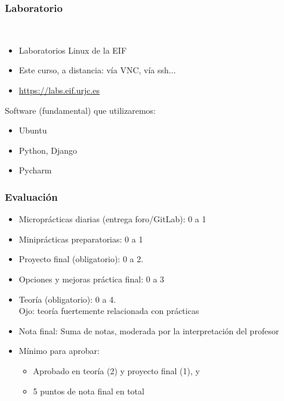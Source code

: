 \begin{frame}
\frametitle{Laboratorio}

~
\vspace{1cm}

\begin{itemize}
\item Laboratorios Linux de la EIF
\item Este curso, a distancia: vía VNC, vía ssh...
\item \url{https://labs.eif.urjc.es}
\end{itemize}

\vspace{1cm}

Software (fundamental) que utilizaremos:

\begin{itemize}
\item Ubuntu
\item Python, Django
\item Pycharm
\end{itemize}
\end{frame}
\usebackgroundtemplate{}



\begin{frame}
\frametitle{Evaluación}

\begin{itemize}
\item Microprácticas diarias (entrega foro/GitLab): 0 a 1
\item Miniprácticas preparatorias: 0 a 1
\item Proyecto final (obligatorio): 0 a 2.
\item Opciones y mejoras práctica final: 0 a 3
\item Teoría (obligatorio): 0 a 4. \\
  \hspace{.5cm} Ojo: teoría fuertemente relacionada con prácticas
\item Nota final: Suma de notas, moderada por la interpretación del profesor
\item Mínimo para aprobar:
      \begin{itemize}
      \item Aprobado en teoría (2) y proyecto final (1), y
      \item 5 puntos de nota final en total
      \end{itemize}
\end{itemize}

\end{frame}

